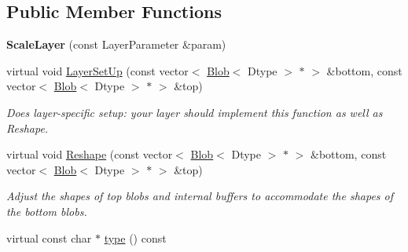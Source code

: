 \subsection*{Public Member Functions}
\begin{DoxyCompactItemize}
\item 
{\bfseries Scale\+Layer} (const Layer\+Parameter \&param)\hypertarget{classcaffe_1_1ScaleLayer_a5af2dfc1148383c6e8073c9660d2b88b}{}\label{classcaffe_1_1ScaleLayer_a5af2dfc1148383c6e8073c9660d2b88b}

\item 
virtual void \hyperlink{classcaffe_1_1ScaleLayer_a04dae324b07eaee6775f9a972c9ab3ab}{Layer\+Set\+Up} (const vector$<$ \hyperlink{classcaffe_1_1Blob}{Blob}$<$ Dtype $>$ $\ast$ $>$ \&bottom, const vector$<$ \hyperlink{classcaffe_1_1Blob}{Blob}$<$ Dtype $>$ $\ast$ $>$ \&top)
\begin{DoxyCompactList}\small\item\em Does layer-\/specific setup\+: your layer should implement this function as well as Reshape. \end{DoxyCompactList}\item 
virtual void \hyperlink{classcaffe_1_1ScaleLayer_ae19c5380c4a95e2e5c07f818cdea9138}{Reshape} (const vector$<$ \hyperlink{classcaffe_1_1Blob}{Blob}$<$ Dtype $>$ $\ast$ $>$ \&bottom, const vector$<$ \hyperlink{classcaffe_1_1Blob}{Blob}$<$ Dtype $>$ $\ast$ $>$ \&top)
\begin{DoxyCompactList}\small\item\em Adjust the shapes of top blobs and internal buffers to accommodate the shapes of the bottom blobs. \end{DoxyCompactList}\item 
virtual const char $\ast$ \hyperlink{classcaffe_1_1ScaleLayer_a0adcd0084790e731f5de5e10e3ca8862}{type} () const \hypertarget{classcaffe_1_1ScaleLayer_a0adcd0084790e731f5de5e10e3ca8862}{}\label{classcaffe_1_1ScaleLayer_a0adcd0084790e731f5de5e10e3ca8862}


\end{DoxyCompactItemize}
